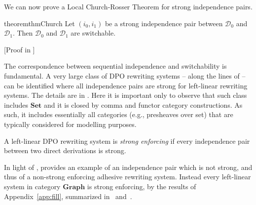 \documentclass[a4paper,UKenglish,cleveref,pdftex,thm-restate,numberwithinsect,anonymous]{lipics}
\newcommand{\cat}[1]{\ensuremath{\mathbf{#1}}}
\newcommand{\dder}[1]{\mathscr{#1}}
\newcommand{\rem}[2]{{\color{blue}#1}{\color{red}#2}}
\renewcommand{\rem}[2]{}
\begin{document}


We can now prove a Local Church-Rosser Theorem for strong independence pairs.


\begin{restatable}{theorem}{thmChurch}
  \label{thm:church}
  Let $(i_0, i_1)$ be a strong independence pair
  between $\dder{D}_0$ and $\dder{D}_1$. Then $\dder{D}_0$ and
  $\dder{D}_1$ are switchable.
\end{restatable}
[Proof in ]

The correspondence between sequential independence and switchability
is fundamental.  A very large class of DPO rewriting systems -- along the
lines of \cite{baldan2011adhesivity} -- can be identified where all
independence pairs are strong for left-linear rewriting systems. The details are in 
. Here it is important only to observe that such class includes $\cat{Set}$ and it is closed by comma and functor category constructions. 
As such, it includes essentially all categories (e.g., presheaves over set) that are typically considered for modelling purposes.



\begin{definition}A left-linear DPO rewriting system is \emph{strong enforcing} if every independence pair between two direct derivations is strong. 
\end{definition}

\begin{example}
  \label{ex:diff2}
  In light of ,  provides an example
  of an independence pair which is not strong, and thus of a non-strong enforcing
  adhesive rewriting system. Instead every left-linear system in category $\cat{Graph}$ is
  strong enforcing, by the results of Appendix~\ref{app:fill}, summarized in~ and~.
\end{example}
\end{document}

